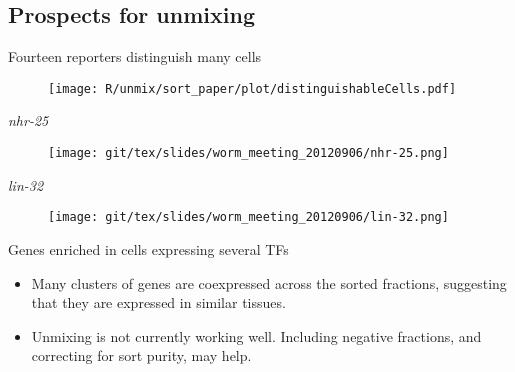 \documentclass[serif,9pt]{beamer}
\begin{document}
\subsection{Prospects for unmixing}

\begin{frame}{Fourteen reporters distinguish many cells}

\begin{figure}
\begin{centering}
\texttt{[image: R/unmix/sort\_paper/plot/distinguishableCells.pdf]}
\end{centering}
\end{figure}

\end{frame}

\begin{frame}{{\em nhr-25}}

\begin{figure}
\begin{centering}
\texttt{[image: git/tex/slides/worm\_meeting\_20120906/nhr-25.png]}
\end{centering}
\end{figure}

\end{frame}

\begin{frame}{{\em lin-32}}

\begin{figure}
\begin{centering}
\texttt{[image: git/tex/slides/worm\_meeting\_20120906/lin-32.png]}
\end{centering}
\end{figure}

\end{frame}

\begin{frame}{Genes enriched in cells expressing several TFs}

\begin{itemize}

\item Many clusters of genes are coexpressed across the sorted fractions,
suggesting that they are expressed in similar tissues.

\item Unmixing is not currently working well. Including negative fractions,
and correcting for sort purity, may help.

\end{itemize}

\end{frame}
\end{document}
